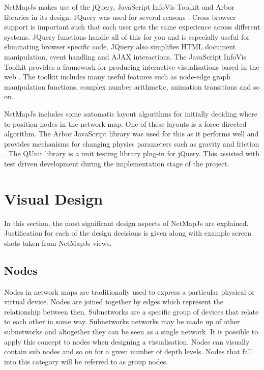 \documentclass[11pt, a4paper]{article}
\begin{document}
NetMapJs makes use of the jQuery, JavaScript InfoVis Toolkit and Arbor libraries
in its design. JQuery was used for several reasons \cite{jQuery_website}. Cross
browser support is important such that each user gets the same experience across
different systems. JQuery functions handle all of this for you and is especially
useful for eliminating browser specific code. JQuery also simplifies HTML
document manipulation, event handling and AJAX interactions. The JavaScript
InfoVis Toolkit provides a framework for producing interactive visualisations
based in the web \cite{thejit_website}. The toolkit includes many useful
features such as node-edge graph manipulation functions, complex number
arithmetic, animation transitions and so on.

NetMapJs includes some automatic layout algorithms for initially deciding
where to position nodes in the network map. One of these layouts is a force
directed algorithm.  The Arbor JavaScript library was used for this as it
performs well and provides mechanisms for changing physics parameters such as
gravity and friction \cite{Arbor_website}. The QUnit library is a unit testing
library plug-in for jQuery. This assisted with test driven development during
the implementation stage of the project.

\newpage

\section{Visual Design} 
\label{sec:visual-design}

In this section, the most significant design aspects of NetMapJs are explained.
Justification for each of the design decisions is given along with example
screen shots taken from NetMapJs views.

\subsection{Nodes}
\label{sec:nodes.vis}


Nodes in network maps are traditionally used to express a particular physical or
virtual device. Nodes are joined together by edges which represent the
relationship between then. Subnetworks are a specific group of devices that
relate to each other in some way. Subnetworks networks may be made up of other
subnetworks and altogether they can be seen as a single network. It is possible
to apply this concept to nodes when designing a visualisation. Nodes can
visually contain sub nodes and so on for a given number of depth levels. Nodes
that fall into this category will be referred to as group nodes.
\end{document}

